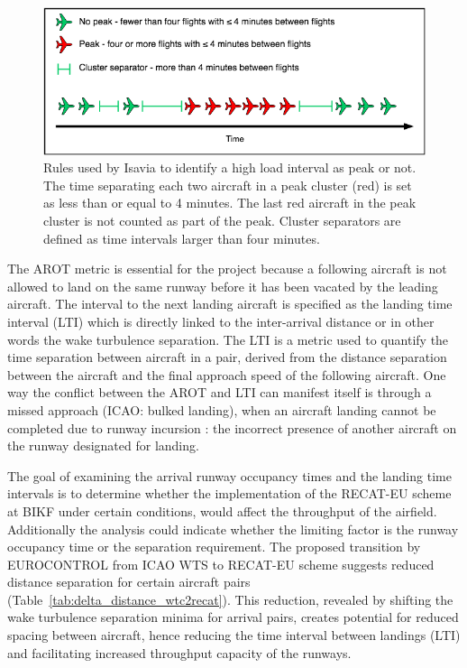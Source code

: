 \begin{figure}[h]
    \centering
    \includegraphics[width=1\textwidth]{graphics/Peak_Diagram.png}
    \caption[Rules defining a peak hour]{Rules used by Isavia to identify a high load interval as peak or not. The time separating each two aircraft in a peak cluster (red) is set as less than or equal to 4 minutes. The last red aircraft in the peak cluster is not counted as part of the peak. Cluster separators are defined as time intervals larger than four minutes.}
    \label{fig:Peak_Diagram}
\end{figure}

The AROT metric is essential for the project because a following aircraft is not allowed to land on the same runway before it has been vacated by the leading aircraft. The interval to the next landing aircraft is specified as the landing time interval (LTI) which is directly linked to the inter-arrival distance or in other words the wake turbulence separation. The LTI is a metric used to quantify the time separation between aircraft in a pair, derived from the distance separation between the aircraft and the final approach speed of the following aircraft. One way the conflict between the AROT and LTI can manifest itself is through a missed approach (ICAO: bulked landing), when an aircraft landing cannot be completed due to runway incursion \cite{doc44444}: the incorrect presence of another aircraft on the runway designated for landing.%

The goal of examining the arrival runway occupancy times and the landing time intervals is to determine whether the implementation of the RECAT-EU scheme at BIKF under certain conditions, would affect the throughput of the airfield. Additionally the analysis could indicate whether the limiting factor is the runway occupancy time or the separation requirement. The proposed transition by EUROCONTROL from ICAO WTS to RECAT-EU scheme suggests reduced distance separation for certain aircraft pairs (Table~\ref{tab:delta_distance_wtc2recat}). This reduction, revealed by shifting the wake turbulence separation minima for arrival pairs, creates potential for reduced spacing between aircraft, hence reducing the time interval between landings (LTI) and facilitating increased throughput capacity of the runways. 

